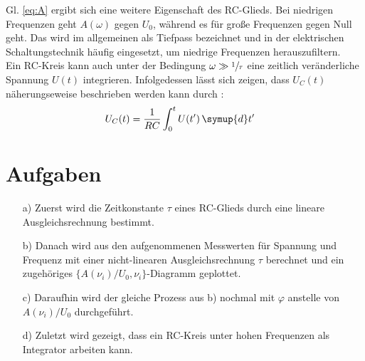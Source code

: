   \newpage
  \justifying Gl. \eqref{eq:A} ergibt sich eine weitere Eigenschaft des RC-Glieds. Bei niedrigen 
  Frequenzen geht $A(\omega)$ gegen $U_0$, während es für große Frequenzen
  gegen Null geht.
  Das wird im allgemeinen als Tiefpass bezeichnet und in der 
  elektrischen Schaltungstechnik häufig eingesetzt, um niedrige Frequenzen
  herauszufiltern.\\
  Ein RC-Kreis kann auch unter der Bedingung $\omega \gg \sfrac{1}{\tau}$ eine 
  zeitlich veränderliche Spannung $U(t)$ integrieren. Infolgedessen lässt sich 
  zeigen, dass $U_C(t)$ näherungseweise beschrieben werden kann durch \cite{V353}:
  \begin{align}
    U_C(t) &= \frac{1}{RC} \int_0^t{U(t') \, \symup{d}t'}\label{eq:int}
  \end{align}


\section{Aufgaben}

 \begin{enumerate}
    \item[a)] \justifying Zuerst wird die Zeitkonstante $\tau$ eines RC-Glieds durch 
              eine lineare Ausgleichsrechnung bestimmt.

    \item[b)] \justifying Danach wird aus den aufgenommenen Messwerten für Spannung und 
              Frequenz mit einer nicht-linearen Ausgleichsrechnung $\tau$ berechnet 
              und ein zugehöriges $\{ A(\nu _i)/U_0,\nu _i \}$-Diagramm geplottet.
  
    \item[c)] \justifying Daraufhin wird der gleiche Prozess aus b) nochmal mit
              $\varphi$ anstelle von $A(\nu _i)/U_0$ durchgeführt.
  
    \item[d)] \justifying Zuletzt wird gezeigt, dass ein RC-Kreis unter hohen Frequenzen 
              als Integrator arbeiten kann.
  \end{enumerate}


